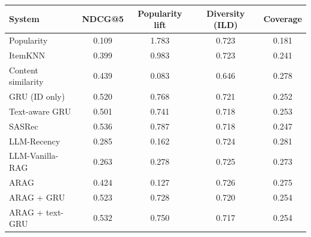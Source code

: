 \begin{tabular}{lcccc}
\toprule
System & NDCG@5 & Popularity lift & Diversity (ILD) & Coverage \\
\midrule
Popularity & 0.109 & 1.783 & 0.723 & 0.181 \\
ItemKNN & 0.399 & 0.983 & 0.723 & 0.241 \\
Content similarity & 0.439 & 0.083 & 0.646 & 0.278 \\
GRU (ID only) & 0.520 & 0.768 & 0.721 & 0.252 \\
Text-aware GRU & 0.501 & 0.741 & 0.718 & 0.253 \\
SASRec & 0.536 & 0.787 & 0.718 & 0.247 \\
LLM-Recency & 0.285 & 0.162 & 0.724 & 0.281 \\
LLM-Vanilla-RAG & 0.263 & 0.278 & 0.725 & 0.273 \\
ARAG & 0.424 & 0.127 & 0.726 & 0.275 \\
ARAG + GRU & 0.523 & 0.728 & 0.720 & 0.254 \\
ARAG + text-GRU & 0.532 & 0.750 & 0.717 & 0.254 \\
\bottomrule
\end{tabular}
